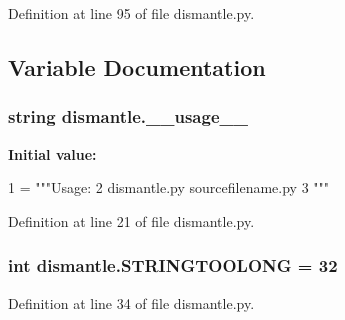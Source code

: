 Definition at line 95 of file dismantle.\-py.



\subsection{Variable Documentation}
\hypertarget{namespacedismantle_a46aea8853af02029a008f2899c711e8c}{
\subsubsection[{\-\_\-\-\_\-usage\-\_\-\-\_\-}]{\setlength{\rightskip}{0pt plus 5cm}string dismantle.\-\_\-\-\_\-usage\-\_\-\-\_\-}}\label{namespacedismantle_a46aea8853af02029a008f2899c711e8c}
{\bfseries Initial value\-:}
\begin{DoxyCode}
1 = \textcolor{stringliteral}{"""Usage:}
2 \textcolor{stringliteral}{    dismantle.py sourcefilename.py}
3 \textcolor{stringliteral}{"""}
\end{DoxyCode}


Definition at line 21 of file dismantle.\-py.

\hypertarget{namespacedismantle_a9db810cc2b3ee053900fbcf23b828aaa}{
\subsubsection[{S\-T\-R\-I\-N\-G\-T\-O\-O\-L\-O\-N\-G}]{\setlength{\rightskip}{0pt plus 5cm}int dismantle.\-S\-T\-R\-I\-N\-G\-T\-O\-O\-L\-O\-N\-G = 32}}\label{namespacedismantle_a9db810cc2b3ee053900fbcf23b828aaa}


Definition at line 34 of file dismantle.\-py.

